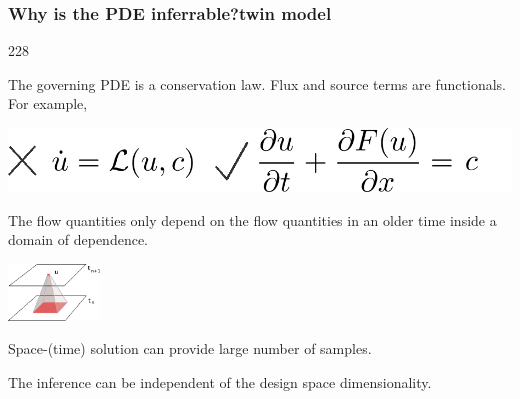 \documentclass{beamer}
\newcommand{\barrow}{\item[\color{darkred}\ding{228}]}
\begin{document}
\begin{frame}
    \frametitle{Why is the PDE inferrable?\hfill \scriptsize{twin model}}\small
    \begin{dinglist}{228}
        \barrow The governing PDE is a conservation law. Flux and source terms are functionals. For example,\\
        \vspace{-.1cm}
        \begin{center}
            \includegraphics[height=.6cm]{two_eqn.png}
        \end{center}
        \vspace{-.1cm}
        \barrow The flow quantities only depend on the flow quantities in an older time
                inside a domain of dependence.\\
        \vspace{-.1cm}
        \begin{center}
            \includegraphics[height=1.5cm]{locality.png}
        \end{center}
        \vspace{-.1cm}
        \barrow Space-(time) solution can provide large number of samples.
        \barrow The inference can be independent of the design space dimensionality.
    \end{dinglist}
\end{frame}
\end{document}
